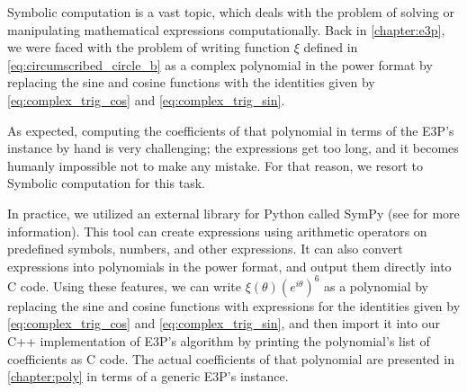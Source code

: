 Symbolic computation is a vast topic, which deals with the problem of solving or manipulating mathematical expressions computationally. 
Back in \autoref{chapter:e3p}, we were faced with the problem of writing function $\xi$ defined in \autoref{eq:circumscribed_circle_b} as a complex polynomial in the power format by replacing the sine and cosine functions with the identities given by  \autoref{eq:complex_trig_cos} and \autoref{eq:complex_trig_sin}.

As expected, computing the coefficients of that polynomial in terms of the E3P's instance by hand is very challenging; the expressions get too long, and it becomes humanly impossible not to make any mistake. 
For that reason, we resort to Symbolic computation for this task.

In practice, we utilized an external library for Python called SymPy (see  for more information).
This tool can create expressions using arithmetic operators on predefined symbols, numbers, and other expressions. It can also convert expressions into polynomials in the power format, and output them directly into C code. Using these features, we can write $\xi(\theta)(e^{i\theta})^6$ as a polynomial by replacing the sine and cosine functions with expressions for the identities given by  \autoref{eq:complex_trig_cos} and \autoref{eq:complex_trig_sin}, and then import it into our C++ implementation of E3P's algorithm by printing the polynomial's list of coefficients as C code.
The actual coefficients of that polynomial are presented in \autoref{chapter:poly} in terms of a generic E3P's instance.






